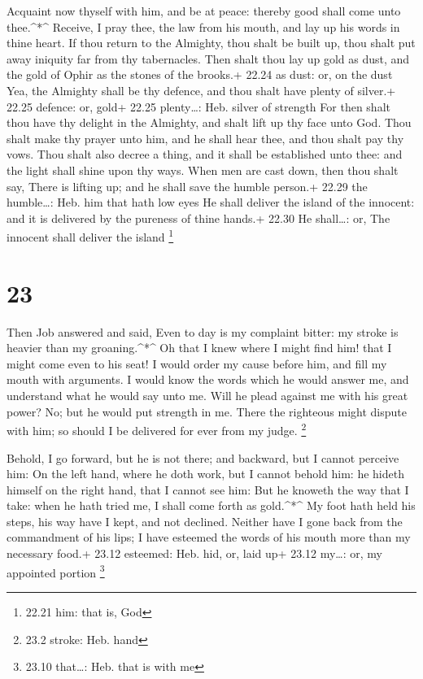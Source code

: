  Acquaint now thyself with him, and be at peace: thereby
good shall come unto thee.\^{}*\^{}  Receive, I pray thee,
the law from his mouth, and lay up his words in thine heart.
 If thou return to the Almighty, thou shalt be built up,
thou shalt put away iniquity far from thy tabernacles. 
Then shalt thou lay up gold as dust, and the gold of Ophir as the stones
of the brooks.+ 22.24 as dust: or, on the dust  Yea, the
Almighty shall be thy defence, and thou shalt have plenty of silver.+
22.25 defence: or, gold+ 22.25 plenty\ldots: Heb. silver of strength
 For then shalt thou have thy delight in the Almighty, and
shalt lift up thy face unto God.  Thou shalt make thy
prayer unto him, and he shall hear thee, and thou shalt pay thy vows.
 Thou shalt also decree a thing, and it shall be
established unto thee: and the light shall shine upon thy ways.
 When men are cast down, then thou shalt say, There is
lifting up; and he shall save the humble person.+ 22.29 the
humble\ldots: Heb. him that hath low eyes  He shall deliver
the island of the innocent: and it is delivered by the pureness of thine
hands.+ 22.30 He shall\ldots: or, The innocent shall deliver the island
\footnote{22.21 him: that is, God}

\hypertarget{section-22}{%
\section{23}\label{section-22}}

 Then Job answered and said,  Even to day is my
complaint bitter: my stroke is heavier than my groaning.\^{}*\^{}
 Oh that I knew where I might find him! that I might come
even to his seat!  I would order my cause before him, and
fill my mouth with arguments.  I would know the words which
he would answer me, and understand what he would say unto me.
 Will he plead against me with his great power? No; but he
would put strength in me.  There the righteous might dispute
with him; so should I be delivered for ever from my judge. \footnote{23.2
  stroke: Heb. hand}

 Behold, I go forward, but he is not there; and backward,
but I cannot perceive him:  On the left hand, where he doth
work, but I cannot behold him: he hideth himself on the right hand, that
I cannot see him:  But he knoweth the way that I take: when
he hath tried me, I shall come forth as gold.\^{}*\^{}  My
foot hath held his steps, his way have I kept, and not declined.
 Neither have I gone back from the commandment of his lips;
I have esteemed the words of his mouth more than my necessary food.+
23.12 esteemed: Heb. hid, or, laid up+ 23.12 my\ldots: or, my appointed
portion \footnote{23.10 that\ldots: Heb. that is with me}

